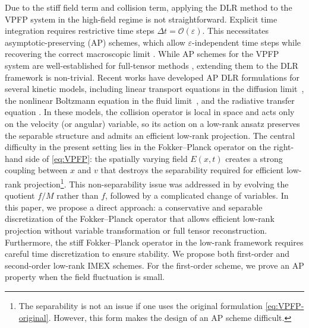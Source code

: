 \documentclass[]{article}
\numberwithin{equation}{section}
\newcommand{\modifysecond}[1]{#1}
\begin{document}
Due to the stiff field term and collision term, applying the DLR method to the VPFP system in the high-field regime is not straightforward. Explicit time integration requires restrictive time steps \(\Delta t=\mathcal{O}(\varepsilon)\). This necessitates asymptotic-preserving (AP) schemes, which allow \(\varepsilon\)-independent time steps while recovering the correct macroscopic limit \cite{jin1999efficient, jin2022asymptotic}. While AP schemes for the VPFP system are well-established for full-tensor methods \cite{jin2011asymptotic, carrillo2021variational, zhu2017hypocoercivity}, extending them to the DLR framework is non-trivial. \modifysecond{Recent works have developed AP DLR formulations for several kinetic models, including linear transport  equations in the diffusion limit~\cite{ding2021dynamical,einkemmer2021asymptotic,einkemmer2024asymptotic}, the nonlinear Boltzmann equation in the fluid limit~\cite{einkemmer2025asymptotic}, and the radiative transfer equation \cite{FKP25}. In these models, the collision operator is local in space and acts only on the velocity (or angular) variable, so its action on a low-rank ansatz preserves the separable structure and admits an efficient low-rank projection.} The central difficulty in the present setting lies in the Fokker--Planck operator on the right-hand side of \eqref{eq:VPFP}: the spatially varying field \(E(x,t)\) creates a strong coupling between \(x\) and \(v\) that destroys the separability required for efficient low-rank projection\footnote{The separability is not an issue if one uses the original formulation \eqref{eq:VPFP-original}. However, this form makes the design of an AP scheme difficult.}.
This non-separability issue was addressed in \cite{coughlin2022efficient} by evolving the quotient $f/M$ rather than $f$, followed by a complicated change of variables. In this paper, we propose a direct approach: a conservative and separable discretization of the Fokker--Planck operator that allows efficient low-rank projection without variable transformation or full tensor reconstruction. Furthermore, the stiff Fokker--Planck operator in the low-rank framework requires careful time discretization to ensure stability. We propose both first-order and second-order low-rank IMEX schemes. For the first-order scheme, we
prove an AP property when the field fluctuation is small. 

\end{document}
